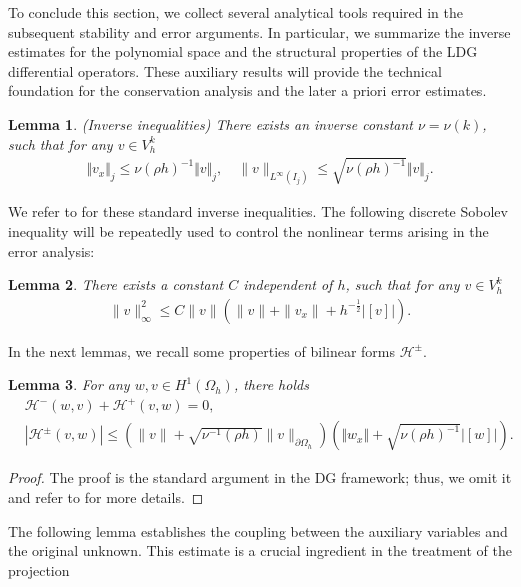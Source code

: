 \documentclass[11pt]{article}
\newcommand{\norm}   [1] {\Vert#1\Vert}
\newcommand{\normb}  [1] {|\![#1]\!|}
\newcommand{\Hcal} {\mathcal{H}}
\newtheorem{lemma}{Lemma}[section]
\numberwithin{equation}{section}
\begin{document}
To conclude this section, we collect several analytical tools required in the subsequent
stability and error arguments. In particular, we summarize the inverse estimates for the
polynomial space and the structural properties of the LDG differential operators. These
auxiliary results will provide the technical foundation for the conservation analysis and the
later a priori error estimates.
\begin{lemma}\label{lemma:inverse}
(Inverse inequalities) There exists an inverse constant $\nu=\nu(k)$, such that for any $v\in V_h^k$
\begin{align} \label{inverse}
\norm{v_x}_{j}  \le \nu (\rho h)^{-1} \norm{v}_j, \quad
\|v\|_{L^\infty(I_j)}\le \sqrt{\nu (\rho h)^{-1}}\norm{v}_{j}.
\end{align}
\end{lemma}
We refer to \cite{Ciarlet1978} for these standard inverse inequalities. The following discrete Sobolev
inequality will be repeatedly used to control the nonlinear terms arising in the error analysis:
\begin{lemma}\label{lemma:infty} \cite[Lemma 4.1]{Wang2024}
There exists a constant $C$ independent of $h$, such that for any $v\in V_h^k$
\begin{align} \label{infty}
\|v\|^2_{\infty}\leq C\|v\|(\|v\|+\|v_x\|+h^{-\frac12}\normb{v}).
\end{align}
\end{lemma}
In the next lemmas, we recall some properties of bilinear forms $\Hcal^{\pm}$.
\begin{lemma}\label{negative:semidef}
For any $w, v \in H^1(\Omega_h)$, there holds
\begin{align}
&\Hcal^-(w,v)+\Hcal^+(v,w)=0, \label{skew}\\
&{|\Hcal^\pm(v,w)|\le  \left(\|v\|+\sqrt{\nu^{-1}(\rho h)}\|v\|_{\partial \Omega_h}\right)\left( \norm{w_x}+\sqrt{\nu (\rho h)^{-1}}\normb{w}\right)}. \label{bond:1}
\end{align}
\end{lemma}
\begin{proof}
The proof is the standard argument in the DG framework; thus, we omit it and refer to  \cite{Zhang2012} for more details.
\end{proof}
The following lemma establishes the coupling between the auxiliary variables and the
original unknown. This estimate is a crucial ingredient in the treatment of the projection
\end{document}
